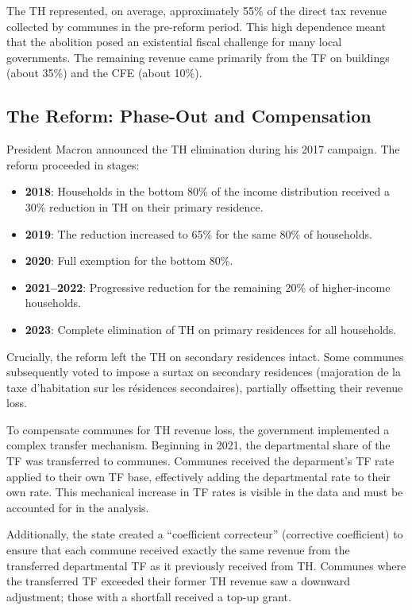 \documentclass[12pt]{article}
\begin{document}
The TH represented, on average, approximately 55\% of the direct tax revenue collected by communes in the pre-reform period. This high dependence meant that the abolition posed an existential fiscal challenge for many local governments. The remaining revenue came primarily from the TF on buildings (about 35\%) and the CFE (about 10\%).

\subsection{The Reform: Phase-Out and Compensation}

President Macron announced the TH elimination during his 2017 campaign. The reform proceeded in stages:

\begin{itemize}
\item \textbf{2018}: Households in the bottom 80\% of the income distribution received a 30\% reduction in TH on their primary residence.
\item \textbf{2019}: The reduction increased to 65\% for the same 80\% of households.
\item \textbf{2020}: Full exemption for the bottom 80\%.
\item \textbf{2021--2022}: Progressive reduction for the remaining 20\% of higher-income households.
\item \textbf{2023}: Complete elimination of TH on primary residences for all households.
\end{itemize}

Crucially, the reform left the TH on secondary residences intact. Some communes subsequently voted to impose a surtax on secondary residences (majoration de la taxe d'habitation sur les r\'esidences secondaires), partially offsetting their revenue loss.

To compensate communes for TH revenue loss, the government implemented a complex transfer mechanism. Beginning in 2021, the departmental share of the TF was transferred to communes. Communes received the deparment's TF rate applied to their own TF base, effectively adding the departmental rate to their own rate. This mechanical increase in TF rates is visible in the data and must be accounted for in the analysis.

Additionally, the state created a ``coefficient correcteur'' (corrective coefficient) to ensure that each commune received exactly the same revenue from the transferred departmental TF as it previously received from TH. Communes where the transferred TF exceeded their former TH revenue saw a downward adjustment; those with a shortfall received a top-up grant.
\end{document}
